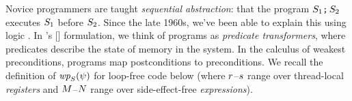 Novice programmers are taught \emph{sequential abstraction}: that the
program $S_1\texttt{;}\,\allowbreak S_2$ executes $S_1$ before $S_2$.  Since
the late 1960s, we've been able to explain this using logic
\citep{Hoare:1969:ABC:363235.363259}.  In
\citeauthor{DBLP:journals/cacm/Dijkstra75}'s
[\citeyear{DBLP:journals/cacm/Dijkstra75}] formulation, we think of programs
as \emph{predicate transformers}, where predicates describe the state of
memory in the system.  In the calculus of weakest preconditions, programs map
postconditions to preconditions.  We recall the definition of
$\fwp{\aCmd}{\bForm}$ for loop-free code below (where $r$--$s$ range over thread-local \emph{registers}
and $M$--$N$ range over side-effect-free
\emph{expressions}). 
